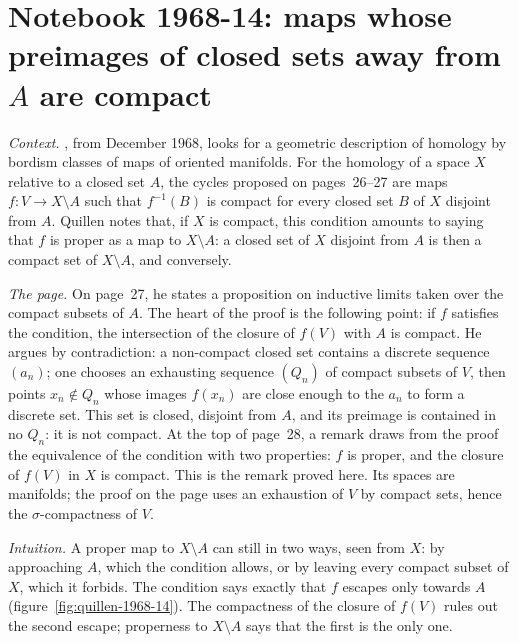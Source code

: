 \section[Notebook 1968-14: compact preimages of closed sets away from $A$]{Notebook 1968-14: maps whose preimages of closed sets away from $A$ are compact\protect\piste\protect{}}\label{sec:quillen-1968-14}

\emph{Context.} , from December 1968, looks for a geometric description of homology by bordism classes of maps of oriented manifolds. For the homology of a space $X$ relative to a closed set $A$, the cycles proposed on pages~26--27 are maps $f : V \to X \setminus A$ such that $f^{-1}(B)$ is compact for every closed set $B$ of $X$ disjoint from $A$. Quillen notes that, if $X$ is compact, this condition amounts to saying that $f$ is proper as a map to $X \setminus A$: a closed set of $X$ disjoint from $A$ is then a compact set of $X \setminus A$, and conversely.

\emph{The page.} On page~27, he states a proposition on inductive limits taken over the compact subsets of $A$. The heart of the proof is the following point: if $f$ satisfies the condition, the intersection of the closure of $f(V)$ with $A$ is compact. He argues by contradiction: a non-compact closed set contains a discrete sequence $(a_n)$; one chooses an exhausting sequence $(Q_n)$ of compact subsets of $V$, then points $x_n \notin Q_n$ whose images $f(x_n)$ are close enough to the $a_n$ to form a discrete set. This set is closed, disjoint from $A$, and its preimage is contained in no $Q_n$: it is not compact. At the top of page~28, a remark draws from the proof the equivalence of the condition with two properties: $f$ is proper, and the closure of $f(V)$ in $X$ is compact. This is the remark proved here. Its spaces are manifolds; the proof on the page uses an exhaustion of $V$ by compact sets, hence the $\sigma$-compactness of $V$.

\emph{Intuition.} A proper map to $X \setminus A$ can still  in two ways, seen from $X$: by approaching $A$, which the condition allows, or by leaving every compact subset of $X$, which it forbids. The condition says exactly that $f$ escapes only towards $A$ (figure~\ref{fig:quillen-1968-14}). The compactness of the closure of $f(V)$ rules out the second escape; properness to $X \setminus A$ says that the first is the only one.



